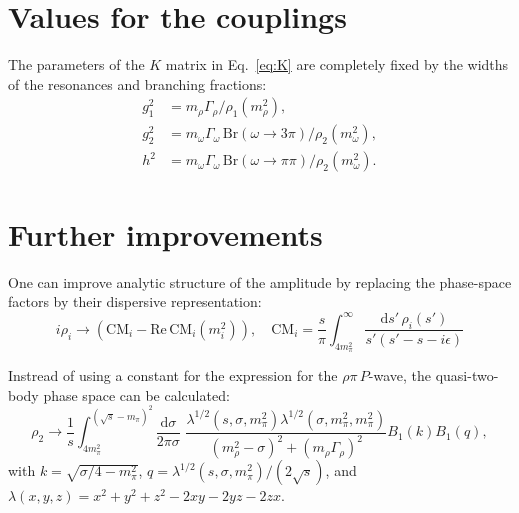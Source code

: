 \documentclass[aps,prd,superscriptaddress,onecolumn,nofootinbib,preprintnumbers,notitlepage]{revtex4-1}
\newcommand{\CM}{\mathrm{CM}}
\newcommand{\diff}{\mathrm{d}}
\begin{document}
\section{Values for the couplings}
The parameters of the $K$ matrix in Eq.~\eqref{eq:K} are completely fixed by the widths of the resonances
and branching fractions:
\begin{align*}
  g_1^2 & = m_\rho \Gamma_\rho / \rho_1(m_\rho^2),\\
  g_2^2 & = m_\omega \Gamma_\omega\,\text{Br}(\omega\to3\pi) / \rho_2(m_\omega^2),\\
  h^2 & = m_\omega \Gamma_\omega\,\text{Br}(\omega\to\pi\pi) / \rho_2(m_\omega^2).
\end{align*}


\section{Further improvements}
One can improve analytic structure of the amplitude by replacing the phase-space factors
by their dispersive representation:
\begin{equation} \label{eq:CM}
i\rho_i \to (\CM_i - \text{Re}\,\CM_i(m_i^2)), \quad
\CM_i = \frac{s}{\pi}\int_{4m_\pi^2}^{\infty} \frac{\diff s'\,\rho_i(s')}{s'(s'-s-i\epsilon)}
\end{equation}

Instread of using a constant for the expression for the $\rho\pi\,P$-wave,
the quasi-two-body phase space can be calculated:
\begin{equation}
\rho_2 \to \frac{1}{s} \int_{4m_\pi^2}^{(\sqrt{s}-m_\pi)^2} \frac{\diff \sigma}{2\pi \sigma}\,\,\frac{\lambda^{1/2}(s,\sigma,m_\pi^2) \lambda^{1/2}(\sigma,m_\pi^2,m_\pi^2)}{(m_\rho^2-\sigma)^2 + (m_\rho \Gamma_\rho)^2} B_1(k) B_1(q),
\end{equation}
with $k = \sqrt{\sigma/4-m_\pi^2}$, $q = \lambda^{1/2}(s,\sigma,m_\pi^2)/(2\sqrt{s})$, and
$\lambda(x,y,z) = x^2+y^2+z^2-2xy-2yz-2zx$.

\end{document}
